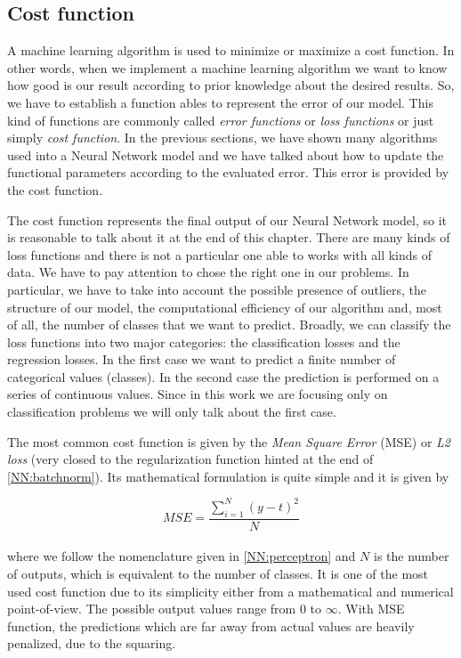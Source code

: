 \documentclass{standalone}
\begin{document}
\subsection[Cost function]{Cost function}\label{NN:cost}

A machine learning algorithm is used to minimize or maximize a cost function.
In other words, when we implement a machine learning algorithm we want to know how good is our result according to prior knowledge about the desired results.
So, we have to establish a function ables to represent the error of our model.
This kind of functions are commonly called \emph{error functions} or \emph{loss functions} or just simply \emph{cost function}.
In the previous sections, we have shown many algorithms used into a Neural Network model and we have talked about how to update the functional parameters according to the evaluated error.
This error is provided by the cost function.

The cost function represents the final output of our Neural Network model, so it is reasonable to talk about it at the end of this chapter.
There are many kinds of loss functions and there is not a particular one able to works with all kinds of data.
We have to pay attention to chose the right one in our problems.
In particular, we have to take into account the possible presence of outliers, the structure of our model, the computational efficiency of our algorithm and, most of all, the number of classes that we want to predict.
Broadly, we can classify the loss functions into two major categories: the classification losses and the regression losses.
In the first case we want to predict a finite number of categorical values (classes).
In the second case the prediction is performed on a series of continuous values.
Since in this work we are focusing only on classification problems we will only talk about the first case.

The most common cost function is given by the \emph{Mean Square Error} (MSE) or \emph{L2 loss} (very closed to the regularization function hinted at the end of \ref{NN:batchnorm}).
Its mathematical formulation is quite simple and it is given by

\begin{equation}
MSE = \frac{\sum_{i=1}^{N}\left( y - t \right)^2}{N}
\end{equation}
\\
where we follow the nomenclature given in \ref{NN:perceptron} and $N$ is the number of outputs, which is equivalent to the number of classes.
It is one of the most used cost function due to its simplicity either from a mathematical and numerical point-of-view.
The possible output values range from $0$ to $\infty$.
With MSE function, the predictions which are far away from actual values are heavily penalized, due to the squaring.
\end{document}
